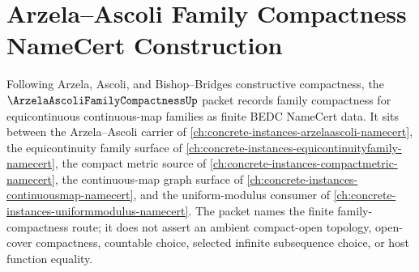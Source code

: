 \chapter{Arzela--Ascoli Family Compactness NameCert Construction}
\label{ch:concrete-instances-arzela-ascoli-family-compactness-namecert}

Following Arzela, Ascoli, and Bishop--Bridges constructive compactness, the $\ArzelaAscoliFamilyCompactnessUp$ packet records family compactness for equicontinuous continuous-map families as finite BEDC NameCert data. It sits between the Arzela--Ascoli carrier of \autoref{ch:concrete-instances-arzelaascoli-namecert}, the equicontinuity family surface of \autoref{ch:concrete-instances-equicontinuityfamily-namecert}, the compact metric source of \autoref{ch:concrete-instances-compactmetric-namecert}, the continuous-map graph surface of \autoref{ch:concrete-instances-continuousmap-namecert}, and the uniform-modulus consumer of \autoref{ch:concrete-instances-uniformmodulus-namecert}. The packet names the finite family-compactness route; it does not assert an ambient compact-open topology, open-cover compactness, countable choice, selected infinite subsequence choice, or host function equality.


